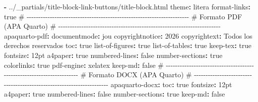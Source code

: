 \documentclass[
  doc,
  floatsintext,
  longtable,
  a4paper,
  nolmodern,
  notxfonts,
  notimes,
  12pt,
  colorlinks=true,linkcolor=blue,citecolor=blue,urlcolor=blue]{apa7}
\newenvironment{Shaded}{\begin{snugshade}}{\end{snugshade}}
\newcommand{\AttributeTok}[1]{\textcolor[rgb]{0.40,0.45,0.13}{#1}}
\newcommand{\CharTok}[1]{\textcolor[rgb]{0.13,0.47,0.30}{#1}}
\newcommand{\CommentTok}[1]{\textcolor[rgb]{0.37,0.37,0.37}{#1}}
\newcommand{\DecValTok}[1]{\textcolor[rgb]{0.68,0.00,0.00}{#1}}
\newcommand{\FunctionTok}[1]{\textcolor[rgb]{0.28,0.35,0.67}{#1}}
\newcommand{\KeywordTok}[1]{\textcolor[rgb]{0.00,0.23,0.31}{\textbf{#1}}}
\begin{document}
\begin{Shaded}
\begin{Highlighting}[]
\AttributeTok{      }\KeywordTok{{-}}\AttributeTok{ ../\_partials/title{-}block{-}link{-}buttons/title{-}block.html}
\AttributeTok{    }\FunctionTok{theme}\KeywordTok{:}\AttributeTok{ litera}
\AttributeTok{    }\FunctionTok{format{-}links}\KeywordTok{:}\AttributeTok{ }\CharTok{true}
\AttributeTok{    }
\CommentTok{  \# {-}{-}{-}{-}{-}{-}{-}{-}{-}{-}{-}{-}{-}{-}{-}{-}{-}{-}{-}{-}{-}{-}{-}{-}{-}{-}{-}{-}{-}{-}{-}{-}{-}{-}{-}{-}{-}{-}{-}{-}{-}{-}{-}{-}{-}{-}{-}{-}{-}{-}{-}{-}{-}{-}{-}{-}{-}{-}{-}{-}{-}{-}{-}{-}{-}{-}{-}{-}{-}{-}}
\CommentTok{  \# Formato PDF (APA Quarto)}
\CommentTok{  \# {-}{-}{-}{-}{-}{-}{-}{-}{-}{-}{-}{-}{-}{-}{-}{-}{-}{-}{-}{-}{-}{-}{-}{-}{-}{-}{-}{-}{-}{-}{-}{-}{-}{-}{-}{-}{-}{-}{-}{-}{-}{-}{-}{-}{-}{-}{-}{-}{-}{-}{-}{-}{-}{-}{-}{-}{-}{-}{-}{-}{-}{-}{-}{-}{-}{-}{-}{-}{-}{-}}
\AttributeTok{  }\FunctionTok{apaquarto{-}pdf}\KeywordTok{:}
\AttributeTok{    }\FunctionTok{documentmode}\KeywordTok{:}\AttributeTok{ jou}
\AttributeTok{    }\FunctionTok{copyrightnotice}\KeywordTok{:}\AttributeTok{ }\DecValTok{2026}
\AttributeTok{    }\FunctionTok{copyrightext}\KeywordTok{:}\AttributeTok{ Todos los derechos reservados}
\AttributeTok{    }\FunctionTok{toc}\KeywordTok{:}\AttributeTok{ }\CharTok{true}
\AttributeTok{    }\FunctionTok{list{-}of{-}figures}\KeywordTok{:}\AttributeTok{ }\CharTok{true}
\AttributeTok{    }\FunctionTok{list{-}of{-}tables}\KeywordTok{:}\AttributeTok{ }\CharTok{true}
\AttributeTok{    }\FunctionTok{keep{-}tex}\KeywordTok{:}\AttributeTok{ }\CharTok{true}
\AttributeTok{    }\FunctionTok{fontsize}\KeywordTok{:}\AttributeTok{ 12pt}
\AttributeTok{    }\FunctionTok{a4paper}\KeywordTok{:}\AttributeTok{ }\CharTok{true}
\AttributeTok{    }\FunctionTok{numbered{-}lines}\KeywordTok{:}\AttributeTok{ }\CharTok{false}
\AttributeTok{    }\FunctionTok{number{-}sections}\KeywordTok{:}\AttributeTok{ }\CharTok{true}
\AttributeTok{    }\FunctionTok{colorlinks}\KeywordTok{:}\AttributeTok{ }\CharTok{true}
\AttributeTok{    }\FunctionTok{pdf{-}engine}\KeywordTok{:}\AttributeTok{ xelatex}
\AttributeTok{    }\FunctionTok{keep{-}md}\KeywordTok{:}\AttributeTok{ }\CharTok{false}
\AttributeTok{    }
\CommentTok{  \# {-}{-}{-}{-}{-}{-}{-}{-}{-}{-}{-}{-}{-}{-}{-}{-}{-}{-}{-}{-}{-}{-}{-}{-}{-}{-}{-}{-}{-}{-}{-}{-}{-}{-}{-}{-}{-}{-}{-}{-}{-}{-}{-}{-}{-}{-}{-}{-}{-}{-}{-}{-}{-}{-}{-}{-}{-}{-}{-}{-}{-}{-}{-}{-}{-}{-}{-}{-}{-}{-}}
\CommentTok{  \# Formato DOCX (APA Quarto)}
\CommentTok{  \# {-}{-}{-}{-}{-}{-}{-}{-}{-}{-}{-}{-}{-}{-}{-}{-}{-}{-}{-}{-}{-}{-}{-}{-}{-}{-}{-}{-}{-}{-}{-}{-}{-}{-}{-}{-}{-}{-}{-}{-}{-}{-}{-}{-}{-}{-}{-}{-}{-}{-}{-}{-}{-}{-}{-}{-}{-}{-}{-}{-}{-}{-}{-}{-}{-}{-}{-}{-}{-}{-}}
\AttributeTok{  }\FunctionTok{apaquarto{-}docx}\KeywordTok{:}
\AttributeTok{    }\FunctionTok{toc}\KeywordTok{:}\AttributeTok{ }\CharTok{true}
\AttributeTok{    }\FunctionTok{fontsize}\KeywordTok{:}\AttributeTok{ 12pt}
\AttributeTok{    }\FunctionTok{a4paper}\KeywordTok{:}\AttributeTok{ }\CharTok{true}
\AttributeTok{    }\FunctionTok{numbered{-}lines}\KeywordTok{:}\AttributeTok{ }\CharTok{false}
\AttributeTok{    }\FunctionTok{number{-}sections}\KeywordTok{:}\AttributeTok{ }\CharTok{true}
\AttributeTok{    }\FunctionTok{keep{-}md}\KeywordTok{:}\AttributeTok{ }\CharTok{false}


\end{Highlighting}
\end{Shaded}
\end{document}
